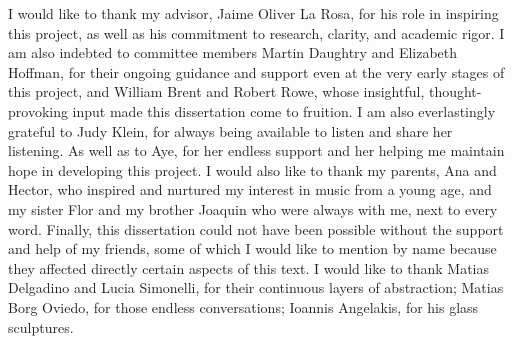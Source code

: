 I would like to thank my advisor, Jaime Oliver La Rosa, for his role in inspiring this project, as well as his commitment to research, clarity, and academic rigor. I am also indebted to committee members Martin Daughtry and Elizabeth Hoffman, for their ongoing guidance and support even at the very early stages of this project, and William Brent and Robert Rowe, whose insightful, thought-provoking input made this dissertation come to fruition. I am also everlastingly grateful to Judy Klein, for always being available to listen and share her listening. As well as to Aye, for her endless support and her helping me maintain hope in developing this project. I would also like to thank my parents, Ana and Hector, who inspired and nurtured my interest in music from a young age, and my sister Flor and my brother Joaquin who were always with me, next to every word. Finally, this dissertation could not have been possible without the support and help of my friends, some of which I would like to mention by name because they affected directly certain aspects of this text. I would like to thank Matias Delgadino and Lucia Simonelli, for their continuous layers of abstraction; Matias Borg Oviedo, for those endless conversations; Ioannis Angelakis, for his glass sculptures.
